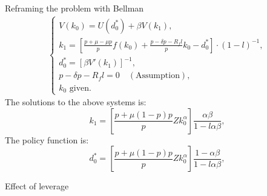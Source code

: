\documentclass{beamer}
\begin{document}
\begin{frame}{Reframing the problem with Bellman}
     \begin{align*}
     \begin{cases}
         V(k_0) = U(d_0^*) + \beta V(k_1), \\
         k_1 = \left[ \frac{p + \mu - \mu p}{p}f(k_{0}) + \frac{p - \delta p - R_f l}{p} k_{0}  - d^*_0 \right] \cdot \left(1-l\right)^{-1}, \\
         d^*_0 = [\beta V'(k_{1})]^{-1},\\
         p - \delta p - R_f l=0 \quad (\text{Assumption}),\\
         k_0 \text{ given.}
     \end{cases}
 \end{align*}
The solutions to the above systems is:
\begin{equation}
    k_1 = \left[ \frac{p + \mu(1-p) p}{p}Z k_0^{\alpha}\right] \frac{\alpha\beta}{1-l\alpha\beta}, \label{eq29}
\end{equation}
The policy function is:
\begin{equation}
    d^*_0 = \left[ \frac{p + \mu (1-p) p}{p}Z k_0^{\alpha}\right] \frac{1-\alpha\beta}{1-l\alpha\beta} \label{eq31},
\end{equation}

\end{frame}
\begin{frame}{Effect of leverage}
    \begin{figure}
    \centering
    \label{plot_part}
\end{figure}
\end{frame}
\end{document}
